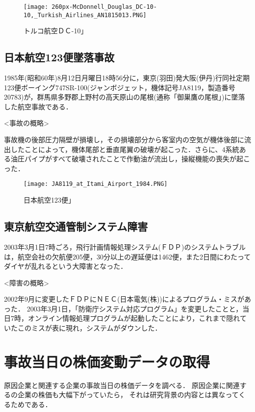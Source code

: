 \begin{figure}[H]
\centering
\texttt{[image: 260px-McDonnell\_Douglas\_DC-10-10,\_Turkish\_Airlines\_AN1815013.PNG]}
\caption{トルコ航空ＤＣ-10」}\label{サンプル図}
\end{figure}


\subsection{日本航空123便墜落事故}

1985年(昭和60年)8月12日月曜日18時56分に，東京(羽田)発大阪(伊丹)行同社定期123便ボーイング747SR-100(ジャンボジェット，機体記号JA8119，製造番号20783)が，群馬県多野郡上野村の高天原山の尾根(通称「御巣鷹の尾根」)に墜落した航空事故である．

<事故の概略>      

事故機の後部圧力隔壁が損壊し，その損壊部分から客室内の空気が機体後部に流出したことによって，機体尾部と垂直尾翼の破壊が起こった．さらに、4系統ある油圧パイプがすべて破壊されたことで作動油が流出し，操縦機能の喪失が起こった\cite{nihon}．

\begin{figure}[H]
\centering
\texttt{[image: JA8119\_at\_Itami\_Airport\_1984.PNG]}
\caption{日本航空123便」}\label{サンプル図}
\end{figure}


\subsection{東京航空交通管制システム障害}

2003年3月1日7時ごろ，飛行計画情報処理システム(ＦＤＰ)のシステムトラブルは，航空会社の欠航便205便，30分以上の遅延便は1462便，また2日間にわたってダイヤが乱れるという大障害となった．

<障害の概略>
 
2002年9月に変更したＦＤＰにＮＥＣ(日本電気(株))によるプログラム・ミスがあった．
2003年3月1日，「防衛庁システム対応プログラム」を変更したことと，当日7時，オンライン情報処理プログラムが起動したことにより，これまで隠れていたこのミスが表に現れ，システムがダウンした\cite{kouku}．


\section{事故当日の株価変動データの取得}

原因企業と関連する企業の事故当日の株価データを調べる．
原因企業に関連するの企業の株価も大幅下がっていたら，
それは研究背景の内容とは異なってくるためである．

